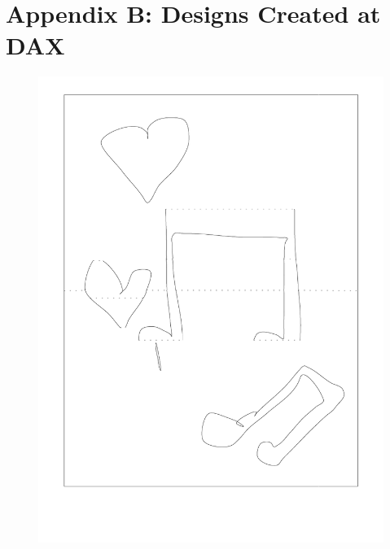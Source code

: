 \section{Appendix B: Designs Created at
DAX}\label{appendix-b-designs-created-at-dax}

\begin{figure}[htbp]
\centering
\includegraphics{figures/91_Appendix_DAX_Creations/music_notes.png}
\caption{}
\end{figure}

